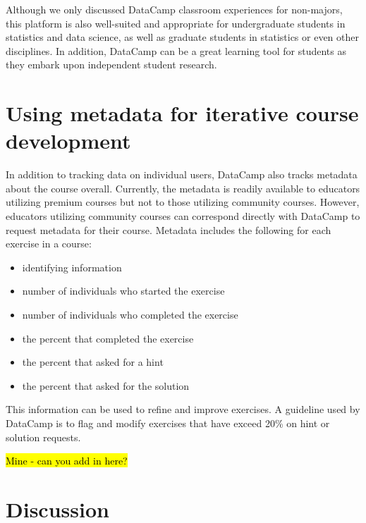 \documentclass{tise_style_doi}
\begin{document}
Although we only discussed DataCamp classroom experiences for non-majors, this
platform is also well-suited and appropriate for undergraduate students in statistics
and data science, as well as graduate students in statistics or even other disciplines.
In addition, DataCamp can be a great learning tool for students
as they embark upon independent student research.


\section{Using metadata for iterative course development}

In addition to tracking data on individual users, DataCamp also tracks metadata 
about the course overall.  Currently, the metadata is readily available to educators
utilizing premium courses but not to those utilizing community courses.  However,
educators utilizing community courses can correspond directly with DataCamp to 
request metadata for their course.  Metadata includes the following for each exercise
in a course:
\begin{itemize}
\item identifying information 
\item number of individuals who started the exercise
\item number of individuals who completed the exercise
\item the percent that completed the exercise
\item the percent that asked for a hint
\item the percent that asked for the solution
\end{itemize} 
This information can be used to refine and improve exercises.  A guideline
used by DataCamp is to flag and modify exercises that have exceed 20\% 
on hint or solution requests.  

\hl{Mine - can you add in here?}

\section{Discussion}
\end{document}
